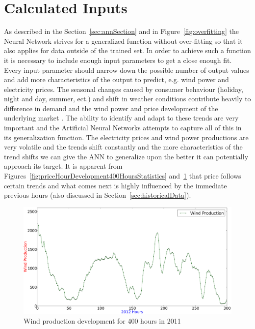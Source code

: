 \section{Calculated Inputs}
\label{sec:usingStatisticalInput}
As described in the Section~\ref{sec:annSection} and in Figure~\ref{fig:overfitting} the Neural Network strives for a generalized function without over-fitting so that it also applies for data outside of the trained set. In order to achieve such a function it is necessary to include enough input parameters to get a close enough fit. Every input parameter should narrow down the possible number of output values and add more characteristics of the output to predict, e.g. wind power and electricity prices. The seasonal changes caused by consumer behaviour (holiday, night and day, summer, ect.) and shift in weather conditions contribute heavily to difference in demand and the wind power and price development of the underlying market \cite{yamin2004adaptive,forecastingSpotPricesAccountingForWindPower}. The ability to identify and adapt to these trends are very important and the Artificial Neural Networks attempts to capture all of this in its generalization function. The electricity prices and wind power productions are very volatile and the trends shift constantly and the more characteristics of the trend shifts we can give the ANN to generalize upon the better it can potentially approach its target. It is apparent from Figures~\ref{fig:priceHourDevelopment400HoursStatistics} and~\ref{fig:windHourDevelopment400HoursStatistics} that price follows certain trends and what comes next is highly influenced by the immediate previous hours (also discussed in Section~\ref{sec:historicalData}). 

\begin{figure}[h]
\centering
\includegraphics[width=0.99\linewidth]{billeder/productionTendency400Hours.png}
\caption{Wind production development for 400 hours in 2011}
\label{fig:windHourDevelopment400HoursStatistics}
\end{figure}

